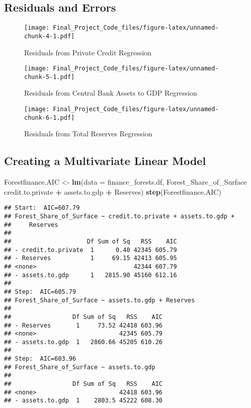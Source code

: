 \documentclass[
  12pt,
]{article}
\newenvironment{Shaded}{\begin{snugshade}}{\end{snugshade}}
\newcommand{\DataTypeTok}[1]{\textcolor[rgb]{0.13,0.29,0.53}{#1}}
\newcommand{\KeywordTok}[1]{\textcolor[rgb]{0.13,0.29,0.53}{\textbf{#1}}}
\newcommand{\NormalTok}[1]{#1}
\newcommand{\OperatorTok}[1]{\textcolor[rgb]{0.81,0.36,0.00}{\textbf{#1}}}
\newcommand{\StringTok}[1]{\textcolor[rgb]{0.31,0.60,0.02}{#1}}
\begin{document}
\hypertarget{residuals-and-errors}{%
\subsection{Residuals and Errors}\label{residuals-and-errors}}

\begin{figure}
\centering
\texttt{[image: Final\_Project\_Code\_files/figure-latex/unnamed-chunk-4-1.pdf]}
\caption{Residuals from Private Credit Regression}
\end{figure}

\begin{figure}
\centering
\texttt{[image: Final\_Project\_Code\_files/figure-latex/unnamed-chunk-5-1.pdf]}
\caption{Residuals from Central Bank Assets to GDP Regression}
\end{figure}

\begin{figure}
\centering
\texttt{[image: Final\_Project\_Code\_files/figure-latex/unnamed-chunk-6-1.pdf]}
\caption{Residuals from Total Reserves Regression}
\end{figure}

\hypertarget{creating-a-multivariate-linear-model}{%
\subsection{Creating a Multivariate Linear
Model}\label{creating-a-multivariate-linear-model}}

\begin{Shaded}
\begin{Highlighting}[]
\NormalTok{Forestfinance.AIC <-}\StringTok{ }\KeywordTok{lm}\NormalTok{(}\DataTypeTok{data =}\NormalTok{ finance_forests.df, Forest_Share_of_Surface }\OperatorTok{~}\StringTok{ }\NormalTok{credit.to.private }\OperatorTok{+}\StringTok{ }\NormalTok{assets.to.gdp }\OperatorTok{+}\StringTok{ }\NormalTok{Reserves)}
 \KeywordTok{step}\NormalTok{(Forestfinance.AIC)}
\end{Highlighting}
\end{Shaded}

\begin{verbatim}
## Start:  AIC=607.79
## Forest_Share_of_Surface ~ credit.to.private + assets.to.gdp + 
##     Reserves
## 
##                     Df Sum of Sq   RSS    AIC
## - credit.to.private  1      0.40 42345 605.79
## - Reserves           1     69.15 42413 605.95
## <none>                           42344 607.79
## - assets.to.gdp      1   2815.90 45160 612.16
## 
## Step:  AIC=605.79
## Forest_Share_of_Surface ~ assets.to.gdp + Reserves
## 
##                 Df Sum of Sq   RSS    AIC
## - Reserves       1     73.52 42418 603.96
## <none>                       42345 605.79
## - assets.to.gdp  1   2860.66 45205 610.26
## 
## Step:  AIC=603.96
## Forest_Share_of_Surface ~ assets.to.gdp
## 
##                 Df Sum of Sq   RSS    AIC
## <none>                       42418 603.96
## - assets.to.gdp  1    2803.5 45222 608.30
\end{verbatim}
\end{document}

